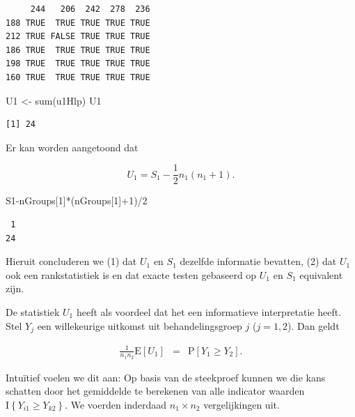 \documentclass[
  dutch,
  letterpaper,
  12pt]{book}
\newenvironment{Shaded}{\begin{snugshade}}{\end{snugshade}}
\newcommand{\DecValTok}[1]{\textcolor[rgb]{0.68,0.00,0.00}{#1}}
\newcommand{\FunctionTok}[1]{\textcolor[rgb]{0.28,0.35,0.67}{#1}}
\newcommand{\NormalTok}[1]{\textcolor[rgb]{0.00,0.23,0.31}{#1}}
\newcommand{\OtherTok}[1]{\textcolor[rgb]{0.00,0.23,0.31}{#1}}
\newcommand{\SpecialCharTok}[1]{\textcolor[rgb]{0.37,0.37,0.37}{#1}}
\theoremstyle{definition}
\theoremstyle{definition}
\theoremstyle{definition}
\theoremstyle{remark}
\begin{document}
\begin{verbatim}
     244   206  242  278  236
188 TRUE  TRUE TRUE TRUE TRUE
212 TRUE FALSE TRUE TRUE TRUE
186 TRUE  TRUE TRUE TRUE TRUE
198 TRUE  TRUE TRUE TRUE TRUE
160 TRUE  TRUE TRUE TRUE TRUE
\end{verbatim}

\begin{Shaded}
\begin{Highlighting}[]
\NormalTok{U1 }\OtherTok{\textless{}{-}} \FunctionTok{sum}\NormalTok{(u1Hlp)}
\NormalTok{U1}
\end{Highlighting}
\end{Shaded}

\begin{verbatim}
[1] 24
\end{verbatim}

Er kan worden aangetoond dat

\[U_1 = S_1 - \frac{1}{2}n_1(n_1+1).\]

\begin{Shaded}
\begin{Highlighting}[]
\NormalTok{S1}\SpecialCharTok{{-}}\NormalTok{nGroups[}\DecValTok{1}\NormalTok{]}\SpecialCharTok{*}\NormalTok{(nGroups[}\DecValTok{1}\NormalTok{]}\SpecialCharTok{+}\DecValTok{1}\NormalTok{)}\SpecialCharTok{/}\DecValTok{2}
\end{Highlighting}
\end{Shaded}

\begin{verbatim}
 1 
24 
\end{verbatim}

Hieruit concluderen we (1) dat \(U_1\) en \(S_1\) dezelfde informatie
bevatten, (2) dat \(U_1\) ook een rankstatistiek is en dat exacte testen
gebaseerd op \(U_1\) en \(S_1\) equivalent zijn.

De statistiek \(U_1\) heeft als voordeel dat het een informatieve
interpretatie heeft. Stel \(Y_j\) een willekeurige uitkomst uit
behandelingsgroep \(j\) (\(j=1,2\)). Dan geldt

\begin{eqnarray*}
  \frac{1}{n_1n_2}\text{E}\left[U_1\right]
     &=& \text{P}\left[Y_1 \geq Y_2\right].
\end{eqnarray*}

Intuïtief voelen we dit aan: Op basis van de steekproef kunnen we die
kans schatten door het gemiddelde te berekenen van alle indicator
waarden \(\text{I}\left\{Y_{i1}\geq Y_{k2}\right\}\). We voerden
inderdaad \(n_1 \times n_2\) vergelijkingen uit.
\end{document}
